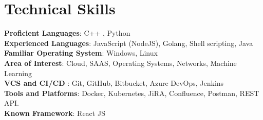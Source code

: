 \section{Technical Skills}
    \begin{itemize}[leftmargin=0.15in, label={}]
	\small{\item{
		\textbf{Proficient Languages}{: C++ , Python} \\
            \textbf{Experienced Languages}{: JavaScript (NodeJS), Golang, Shell scripting, Java} \\
		\textbf{Familiar Operating System}{: Windows, Linux} \\
		\textbf{Area of Interest}{: Cloud, SAAS, Operating Systems,       Networks, Machine Learning}\\
            \textbf{VCS and CI/CD }{: Git, GitHub, Bitbucket, Azure DevOps, Jenkins} \\
            \textbf{Tools and Platforms}{: Docker, Kubernetes, JiRA, Confluence, Postman, REST API.} \\
            \textbf{Known Framework}{: React JS} \\
	}}
    \end{itemize}
